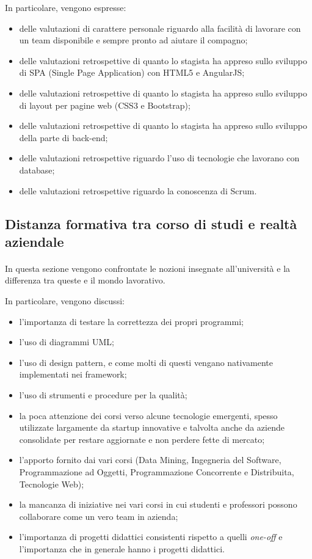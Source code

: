 \documentclass[
article,
10pt, %
oneside, %
BCOR5mm, %
]{scrartcl}
\begin{document}
In particolare, vengono espresse:

\begin{itemize}
\item delle valutazioni di carattere personale riguardo alla facilità di
  lavorare con un team disponibile e sempre pronto ad aiutare il compagno;
\item delle valutazioni retrospettive di quanto lo stagista ha appreso sullo
  sviluppo di SPA (Single Page Application) con HTML5 e AngularJS;
\item delle valutazioni retrospettive di quanto lo stagista ha appreso sullo
  sviluppo di layout per pagine web (CSS3 e Bootstrap);
\item delle valutazioni retrospettive di quanto lo stagista ha appreso sullo
  sviluppo della parte di back-end;
\item delle valutazioni retrospettive riguardo l'uso di tecnologie che
  lavorano con database;
\item delle valutazioni retrospettive riguardo la conoscenza di Scrum.
\end{itemize}

\subsection{Distanza formativa tra corso di studi e realtà aziendale}
\paragraph{} In questa sezione vengono confrontate le nozioni insegnate
all'università e la differenza tra queste e il mondo lavorativo.

In particolare, vengono discussi:

\begin{itemize}
\item l'importanza di testare la correttezza dei propri programmi;
\item l'uso di diagrammi UML;
\item l'uso di design pattern, e come molti di questi vengano nativamente
  implementati nei framework;
\item l'uso di strumenti e procedure per la qualità;
\item la poca attenzione dei corsi verso alcune tecnologie emergenti,
  spesso utilizzate largamente da startup innovative e talvolta anche da
  aziende consolidate per restare aggiornate e non perdere fette di mercato;
\item l'apporto fornito dai vari corsi (Data Mining, Ingegneria del Software,
  Programmazione ad Oggetti, Programmazione Concorrente e Distribuita,
  Tecnologie Web);
\item la mancanza di iniziative nei vari corsi in cui studenti e professori
  possono collaborare come un vero team in azienda;
\item l'importanza di progetti didattici consistenti rispetto a quelli
  \emph{one-off} e l'importanza che in generale hanno i progetti didattici.
\end{itemize}
\end{document}
